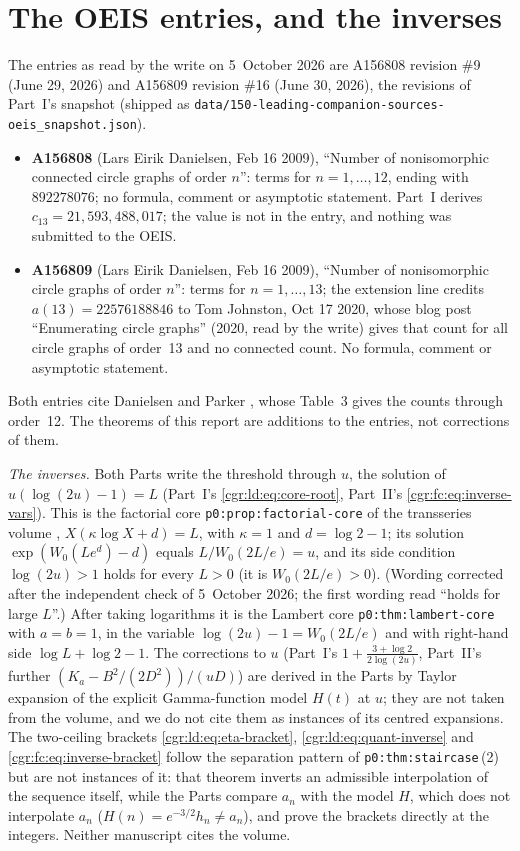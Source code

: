\documentclass[11pt,letterpaper]{article}
\numberwithin{equation}{section}
\theoremstyle{definition}\newtheorem{definition}[theorem]{Definition}
\theoremstyle{remark}\newtheorem{remark}[theorem]{Remark}
\newcommand{\file}[1]{\nolinkurl{#1}}
\begin{document}
\section*{The OEIS entries, and the inverses}\label{cgr:sec:oeis}
The entries as read by the write on 5~October 2026 are A156808 revision \#9 (June 29, 2026) and A156809 revision \#16 (June 30, 2026), the revisions of Part~I's snapshot (shipped as \file{data/150-leading-companion-sources-oeis_snapshot.json}).
\begin{itemize}
\item \textbf{A156808} (Lars Eirik Danielsen, Feb 16 2009), ``Number of nonisomorphic connected circle graphs of order $n$'': terms for $n=1,\ldots,12$, ending with $892278076$; no formula, comment or asymptotic statement. Part~I derives $c_{13}=21{,}593{,}488{,}017$; the value is not in the entry, and nothing was submitted to the OEIS.
\item \textbf{A156809} (Lars Eirik Danielsen, Feb 16 2009), ``Number of nonisomorphic circle graphs of order $n$'': terms for $n=1,\ldots,13$; the extension line credits $a(13)=22576188846$ to Tom Johnston, Oct 17 2020, whose blog post ``Enumerating circle graphs'' (2020, read by the write) gives that count for all circle graphs of order~13 and no connected count. No formula, comment or asymptotic statement.
\end{itemize}
Both entries cite Danielsen and Parker \cite{DP09}, whose Table~3 gives the counts through order~12. The theorems of this report are additions to the entries, not corrections of them.

\emph{The inverses.} Both Parts write the threshold through $u$, the solution of $u(\log(2u)-1)=L$ (Part~I's \eqref{cgr:ld:eq:core-root}, Part~II's \eqref{cgr:fc:eq:inverse-vars}). This is the factorial core \texttt{p0:prop:factorial-core} of the transseries volume \cite{TSvol}, $X(\kappa\log X+d)=L$, with $\kappa=1$ and $d=\log2-1$; its solution $\exp(W_0(Le^{d})-d)$ equals $L/W_0(2L/e)=u$, and its side condition $\log(2u)>1$ holds for every $L>0$ (it is $W_0(2L/e)>0$). \textup{(Wording corrected after the independent check of 5~October 2026; the first wording read ``holds for large $L$''.)} After taking logarithms it is the Lambert core \texttt{p0:thm:lambert-core} with $a=b=1$, in the variable $\log(2u)-1=W_0(2L/e)$ and with right-hand side $\log L+\log2-1$. The corrections to $u$ (Part~I's $1+\frac{3+\log2}{2\log(2u)}$, Part~II's further $(K_a-B^2/(2D^2))/(uD)$) are derived in the Parts by Taylor expansion of the explicit Gamma-function model $H(t)$ at $u$; they are not taken from the volume, and we do not cite them as instances of its centred expansions. The two-ceiling brackets \eqref{cgr:ld:eq:eta-bracket}, \eqref{cgr:ld:eq:quant-inverse} and \eqref{cgr:fc:eq:inverse-bracket} follow the separation pattern of \texttt{p0:thm:staircase}\,(2) but are not instances of it: that theorem inverts an admissible interpolation of the sequence itself, while the Parts compare $a_n$ with the model $H$, which does not interpolate $a_n$ ($H(n)=e^{-3/2}h_n\ne a_n$), and prove the brackets directly at the integers. Neither manuscript cites the volume.
\end{document}
